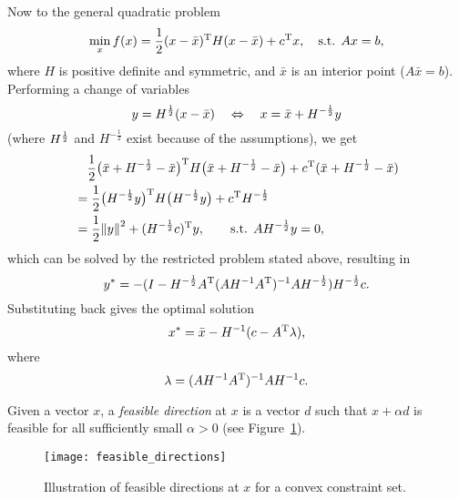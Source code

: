 \documentclass{article}
\begin{document}
Now to the general quadratic problem
\begin{equation*}
  \min_x f(x) = \frac{1}{2} (x - \bar{x})^{\mathrm{T}} H (x - \bar{x}) + c^{\mathrm{T}}x, \quad\text{s.t. } Ax = b,
\end{equation*}
where \(H\) is positive definite and symmetric, and \(\bar{x}\) is an interior point
(\(A\bar{x} = b\)).  Performing a change of variables
\begin{equation*}
  y = H^{\frac{1}{2}}(x - \bar{x}) \quad\Leftrightarrow\quad x = \bar{x} + H^{-\frac{1}{2}}y
\end{equation*}
(where \(H^{\frac{1}{2}}\) and \(H^{-\frac{1}{2}}\) exist because of the assumptions), we get
\begin{align*}
  &\quad \frac{1}{2} \T{\big( \bar{x} + H^{-\frac{1}{2}} - \bar{x} \big)} H
  \big( \bar{x} + H^{-\frac{1}{2}} - \bar{x} \big) + \T{c}(\bar{x} + H^{-\frac{1}{2}} - \bar{x})
  \\
  &= \frac{1}{2} \T{\big(H^{-\frac{1}{2}}y\big)} H \big(H^{-\frac{1}{2}}y\big) +
    \T{c}H^{-\frac{1}{2}} \\
  &= \frac{1}{2} \enVert{y}^2 + \T{(H^{-\frac{1}{2}}c)}y, \qquad\text{s.t. } AH^{-\frac{1}{2}}y = 0,
\end{align*}
which can be solved by the restricted problem stated above, resulting in
\begin{equation*}
  y^* = -(I - H^{-\frac{1}{2}}A^{\mathrm{T}} (AH^{-1}A^{\mathrm{T}})^{-1} A H^{-\frac{1}{2}}) H^{-\frac{1}{2}}c.
\end{equation*}
Substituting back gives the optimal solution
\begin{equation*}
  x^* = \bar{x} - H^{-1}(c - A^{\mathrm{T}}\lambda),
\end{equation*}
where
\begin{equation*}
  \lambda = (AH^{-1}A^{\mathrm{T}})^{-1} A H^{-1}c.
\end{equation*}

\label{s:feasible-direction-methods}

Given a vector \(x\), a \emph{feasible direction} at \(x\) is a vector \(d\) such that
\(x + \alpha d\) is feasible for all sufficiently small \(\alpha > 0\) (see
Figure~\ref{fig:feasible-directions}).

\begin{figure}[H]
  \centering
  \texttt{[image: feasible\_directions]}
  \caption{Illustration of feasible directions at \(x\) for a convex constraint
    set.\label{fig:feasible-directions}}
\end{figure}
\end{document}
